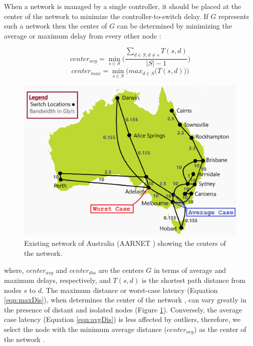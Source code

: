 \documentclass[final,5p,times]{cas-dc}
\begin{document}
	
	
	When a network is managed by a single controller, it should be placed at the center of the network to minimize the controller-to-switch delay. If $G$ represents such a network then the center of $G$ can be determined by minimizing the average or maximum delay from every other node \cite{wilson1979introduction}:
	
	\begin{equation} \label{eqn:avgDis}
	center_{avg} = \min_{s\in S}\bigg(\frac{\sum_{d\in S, d\ne s}T(s,d)}{|S|-1}\bigg)
	\end{equation}
	\begin{equation} \label{eqn:maxDis}
	center_{max} = \min_{s\in S}\bigg(max_{d\in S}\big(T(s,d)\big)\bigg)
	\end{equation}
	\begin{figure}
		\centering
		\includegraphics[width=0.9\linewidth]{Images/Aarnet.png}
		\caption{Existing network of Australia (AARNET \cite{knight2011internet}) showing the centers of the network.}
		\label{fig:aarnetcc}
	\end{figure}
	where, $center_{avg}$ and $center_{dia}$ are the centers $G$ in terms of average and maximum delays, respectively, and $T(s,d)$ is the shortest path distance from nodes $s$ to $d$. The maximum distance or worst-case latency (Equation \ref{eqn:maxDis}), when determines the center of the network \cite{wilson1979introduction}, can vary greatly in the presence of distant and isolated nodes (Figure \ref{fig:aarnetcc}). Conversely, the average case latency (Equation \ref{eqn:avgDis}) is less affected by outliers, therefore, we select the node with the minimum average distance ($center_{avg}$) as the center of the network \cite{wilson1979introduction}.
	
\end{document}
